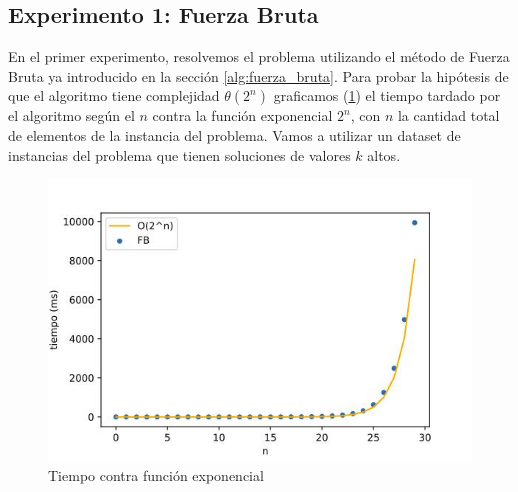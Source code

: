 \documentclass[10pt,a4paper]{article}
\begin{document}
\subsection{Experimento 1: Fuerza Bruta}
En el primer experimento, resolvemos el problema utilizando el método de Fuerza Bruta ya introducido en la sección \ref{alg:fuerza_bruta}. Para probar la hipótesis de que el algoritmo tiene complejidad $\theta(2^{n})$ graficamos (\ref{fig:fb-complejidad}) el tiempo tardado por el algoritmo según el $n$ contra la función exponencial $2^{n}$, con $n$ la cantidad total de elementos de la instancia del problema. Vamos a utilizar un dataset de instancias del problema que tienen soluciones de valores $k$ altos.

\begin{figure}[h!]
	\centering
		\includegraphics[scale=0.35]{img/fb-complejidad.jpg}
		\caption{Tiempo contra función exponencial}
		\label{fig:fb-complejidad}


    
\end{figure}
\end{document}
